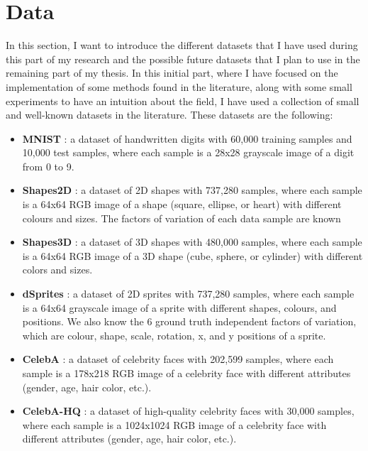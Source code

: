 \chapter{Data}\label{ch:data}

In this section, I want to introduce the different datasets that I have used during this part of my research and the possible 
future datasets that I plan to use in the remaining part of my thesis. In this initial part, where I have focused on the 
implementation of some methods found in the literature, along with some small experiments to have an intuition about the 
field, I have used a collection of small and well-known datasets in the literature. These datasets are the following:
\begin{itemize}
    \item \textbf{MNIST} \cite{mnist}: a dataset of handwritten digits with 60,000 training samples and 10,000 test samples, 
    where each sample is a 28x28 grayscale image of a digit from 0 to 9. 
    \item \textbf{Shapes2D} \cite{locatello2019challengingcommonassumptionsunsupervised}: a dataset of 2D shapes with 737,280 samples, where each sample is a 64x64 
    RGB image of a shape (square, ellipse, or heart) with different colours and sizes. The factors of variation of each data sample are known 
    \item \textbf{Shapes3D} \cite{locatello2019challengingcommonassumptionsunsupervised}: a dataset of 3D shapes with 480,000 samples, where each sample is a 64x64 
    RGB image of a 3D shape (cube, sphere, or cylinder) with different colors and sizes.
    \item \textbf{dSprites} \cite{dsprites17}: a dataset of 2D sprites with 737,280 samples, where each sample is a 64x64 grayscale image 
    of a sprite with different shapes, colours, and positions. We also know the 6 ground truth independent factors of variation, which are colour, shape, scale, rotation, x, and y positions of a sprite. 
    \item \textbf{CelebA} \cite{liu2015faceattributes}: a dataset of celebrity faces with 202,599 samples, where each sample is a 178x218 
    RGB image of a celebrity face with different attributes (gender, age, hair color, etc.).
    \item \textbf{CelebA-HQ} \cite{karras2018progressivegrowinggansimproved}: a dataset of high-quality celebrity faces with 30,000 samples, where each sample 
    is a 1024x1024 RGB image of a celebrity face with different attributes (gender, age, hair color, etc.).
\end{itemize} 

